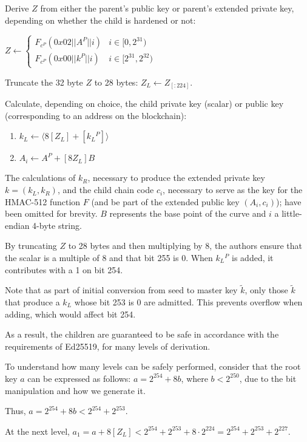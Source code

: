 \documentclass[12pt, a4paper, twocolumn]{article}
\begin{document}
Derive $Z$ from either the parent's public key or parent's extended private key, depending on whether the child is hardened or not:

$  Z \leftarrow 
  \begin{cases} 
  F_{c^P}(0x02||A^P||i) & i \in  [0, 2^{31}) \\
  F_{c^P}(0x00||k^P||i) & i \in [2^{31}, 2^{32})
  \end{cases}
  $

Truncate the 32 byte $Z$ to 28 bytes: $Z_L \leftarrow Z_{[:224]}$.

Calculate, depending on choice, the child private key (scalar) or public key (corresponding to an address on the blockchain):

\begin{enumerate}[label={}] 
  \item $k_L \leftarrow \langle 8[Z_L]  + [k{_L}^P]\rangle$ 
  \item $A_i \leftarrow A^P + [8Z_L]B$
\end{enumerate}


The calculations of $k_R$, necessary to produce the extended private key $k = (k_L, k_R)$, and the child chain code $c_i$, necessary to serve as the key for the HMAC-512 function $F$ (and be part of the extended public key $(A_i, c_i)$); have been omitted for brevity. $B$ represents the base point of the curve and $i$ a little-endian 4-byte string.

By truncating $Z$ to 28 bytes and then multiplying by 8, the authors ensure that the scalar is a multiple of 8 and that bit 255 is 0. When $k{_L}^P$ is added, it contributes with a 1 on bit 254.

Note that as part of initial conversion from seed to master key $\tilde{k}$, only those $\tilde{k}$ that produce a $k_L$ whose bit 253 is 0 are admitted. This prevents overflow when adding, which would affect bit 254.

As a result, the children are guaranteed to be safe in accordance with the requirements of Ed25519, for many levels of derivation.

To understand how many levels can be safely performed, consider that the root key $a$ can be expressed as follows: $a = 2^{254} + 8b$, where $b < 2^{250}$, due to the bit manipulation and how we generate it. 

Thus, $a = 2^{254} + 8b < 2^{254} + 2^{253}$.

At the next level, $a_{1} = a + 8[Z_L] < 2^{254} + 2^{253} + 8 \cdot 2^{224} = 2^{254} + 2^{253} + 2^{227}$.
\end{document}
